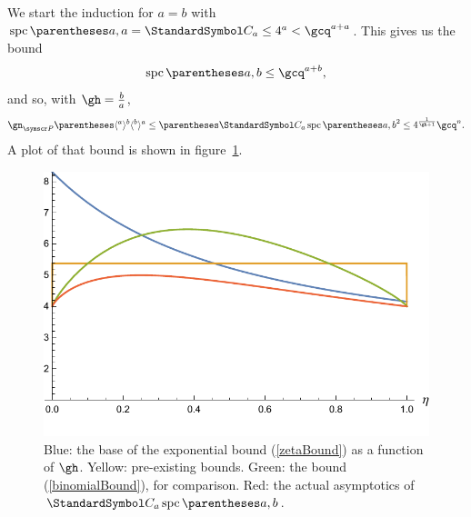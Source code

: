 We start the induction for $a=b$ with $\spc\of{a,a}=\CatalanNumber a \leq 4^{a} < \gcq^{a+a}$.
This gives us the bound\[
\spc\of{a,b}\leq\gcq^{a+b}\text,
\]
and so, with $\gh=\frac{b}{a}$,\begin{equation}
\gn_{\pointset P}\of{\langle^a\rangle^b\langle^b\rangle^a} \leq \pa{\CatalanNumber a \spc\of{a,b}}^2\leq 4^{\frac{1}{\gh+1}} \gcq^{n}\text.
\label{zetaBound}
\end{equation}
A plot of that bound is shown in figure~\ref{figZetaBound}.

\begin{figure}[htb!]
\centering
\includegraphics[scale=0.75]{spc-zeta-bound.pdf}
\caption{Blue: the base of the exponential bound (\ref{zetaBound}) as a function of $\gh$. Yellow: pre-existing bounds.
Green: the bound (\ref{binomialBound}), for comparison. Red: the actual asymptotics of $\CatalanNumber a \spc\of{a,b}$.\label{figZetaBound}}
\end{figure}